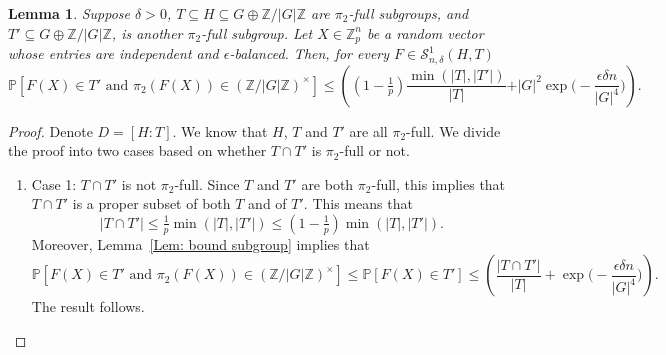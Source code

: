 \documentclass[12pt]{amsart}
\newtheorem{lemma}[theorem]{Lemma}
\theoremstyle{definition}
\newcommand{\PPP}{\mathbb{P}}
\newcommand{\SSO}[3]{\mathcal{S}^1_{#1}(#2,#3)}
\newcommand{\ZG}{\Z/\abs{G}\Z}
\newcommand{\abs}[1]{\vert#1\vert}
\newcommand{\Zp}{\Z_p}
\newcommand{\Z}{\mathbb{Z}}
\begin{document}
\begin{lemma}\label{Lem: bound subgroup, pi_2 full, depth}
Suppose $\delta>0$, $T\subseteq H\subseteq G\oplus\ZG$ are $\pi_2$-full subgroups, and $T'\subseteq G\oplus \ZG$, is another $\pi_2$-full subgroup.
Let $X\in\Zp^n$ be a random vector whose entries are independent and $\epsilon$-balanced.
Then, for every $F\in\SSO{n,\delta}{H}{T}$
\[
\PPP[F(X)\in T' \text{ and } \pi_2(F(X))\in (\ZG)^{\times}]
\leq 
 \left( (1-\tfrac{1}{p}) \frac{\min(\abs{T},\abs{T'})}{\abs{T}}
 +\abs{G}^2\exp\Big(-\frac{\epsilon\delta n}{|G|^4}\Big) \right).
\]
\end{lemma}
\begin{proof}
Denote $D=[H:T]$.
We know that $H$, $T$ and $T'$ are all $\pi_2$-full.
We divide the proof into two cases based on whether $T\cap T'$ is $\pi_2$-full or not.

\begin{enumerate}
    \item Case 1: $T\cap T'$ is not $\pi_2$-full. Since $T$ and $T'$ are both $\pi_2$-full, this implies that $T\cap T'$ is a proper subset of both $T$ and of $T'$. This means that
    \[
    \abs{T\cap T'}
    \leq \tfrac{1}{p} \min(\abs{T}, \abs{T'})
    \leq (1-\tfrac{1}{p}) \min(\abs{T}, \abs{T'}).
    \]
    Moreover, Lemma~\ref{Lem: bound subgroup} implies that
    \[
    \PPP[F(X)\in T' \text{ and } \pi_2(F(X))\in (\ZG)^{\times}]
    \leq \PPP[F(X)\in T']
    \leq 
     \left(\frac{\abs{T\cap T'}}{\abs{T}}+\exp\Big(-\frac{\epsilon\delta n}{|G|^4}\Big) \right).
    \]
    The result follows.


\end{enumerate}
\end{proof}
\end{document}
